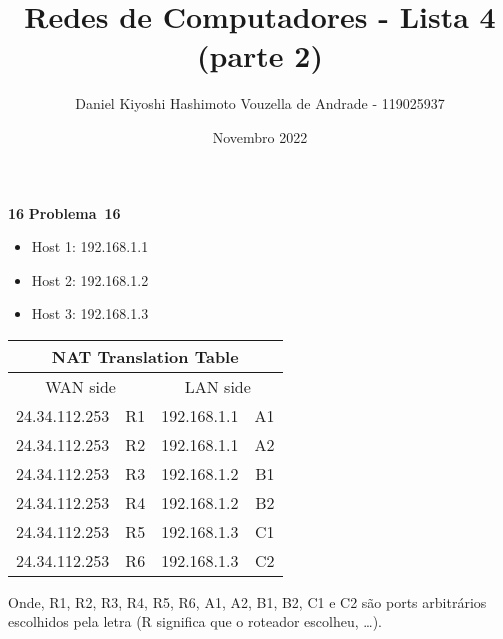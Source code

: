 \documentclass{article}
\title{Redes de Computadores - Lista 4 (parte 2)}
\author{Daniel Kiyoshi Hashimoto Vouzella de Andrade - 119025937}
\date{Novembro 2022}
\newcommand{\blank}{\rule[0pt]{5em}{.3pt}}
\newcommand{\preamble}[2]{\noindent%
    Fiz esse trabalho com a ajuda de {\bfseries #1}
    e consultei {\bfseries #2}.
    A versão final do trabalho foi feita
    por mim de forma independente.
    Respostas sem no mínimo 3 frases de justificativa
    não contam ponto.
    \par\noindent Assinatura: \blank\blank\bigskip}
\newcounter{exe-list}
\newenvironment{exe-list}
    {\begin{list}{\alph{exe-list}.}{\usecounter{exe-list}}}
    {\end{list}}
\newenvironment{exe}[2][Problema]
    {\newcommand{\opt}{(Opcional)}%
    \newcommand{\sketch}[1]{{\bfseries Rascunho:} ##1}%
    \medskip\par\noindent\ifthenelse{\equal{#1}{}}
        {\textbf{\large #2}}
        {\textbf{\large #1~#2}}%
    \medskip\par\noindent}
    {\medskip}
\begin{document}
\maketitle


\begin{exe}{16}
    \begin{exe-list}
    \item
        \begin{itemize}
        \item Host 1: 192.168.1.1
        \item Host 2: 192.168.1.2
        \item Host 3: 192.168.1.3
        \end{itemize}
    \item \hspace{1ex}\par
        \begin{center} \begin{tabular}{|lr|lr|} \hline
            \multicolumn{4}{|c|}{\textbf{NAT Translation Table}} \\\hline
            \multicolumn{2}{|c|}{WAN side}
                & \multicolumn{2}{|c|}{LAN side} \\\hline
            24.34.112.253 & R1 & 192.168.1.1 & A1 \\\hline
            24.34.112.253 & R2 & 192.168.1.1 & A2 \\\hline
            24.34.112.253 & R3 & 192.168.1.2 & B1 \\\hline
            24.34.112.253 & R4 & 192.168.1.2 & B2 \\\hline
            24.34.112.253 & R5 & 192.168.1.3 & C1 \\\hline
            24.34.112.253 & R6 & 192.168.1.3 & C2 \\\hline
        \end{tabular} \end{center}
        Onde, R1, R2, R3, R4, R5, R6, A1, A2, B1, B2, C1 e C2
        são ports arbitrários escolhidos pela letra
        (R significa que o roteador escolheu, \dots).
    \end{exe-list}
\end{exe}
\end{document}
